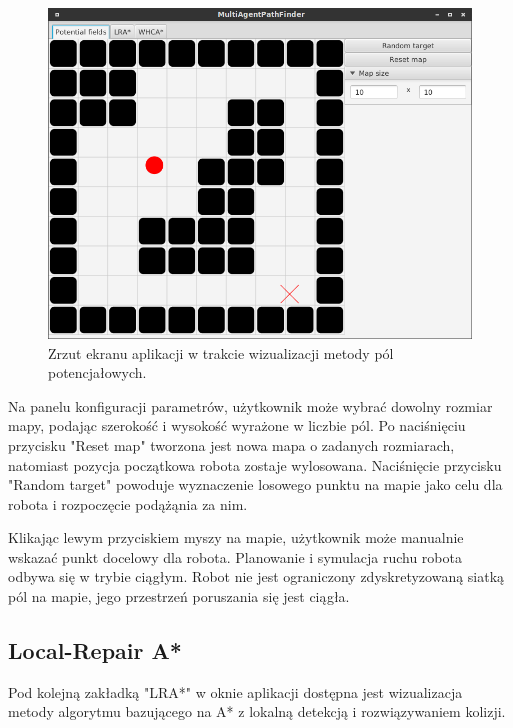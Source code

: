 \begin{figure}
	\centering
	\includegraphics[width=0.8\columnwidth]{img/robopath/ui-fields}
	\caption{Zrzut ekranu aplikacji w trakcie wizualizacji metody pól potencjałowych.}
	\label{fig:robopath-ui-fields}
\end{figure}

Na panelu konfiguracji parametrów, użytkownik może wybrać dowolny rozmiar mapy, podając szerokość i wysokość wyrażone w liczbie pól.
Po naciśnięciu przycisku "Reset map" tworzona jest nowa mapa o zadanych rozmiarach, natomiast pozycja początkowa robota zostaje wylosowana.
Naciśnięcie przycisku "Random target" powoduje wyznaczenie losowego punktu na mapie jako celu dla robota i rozpoczęcie podążąnia za nim.

Klikając lewym przyciskiem myszy na mapie, użytkownik może manualnie wskazać punkt docelowy dla robota.
Planowanie i symulacja ruchu robota odbywa się w trybie ciągłym. Robot nie jest ograniczony zdyskretyzowaną siatką pól na mapie, jego przestrzeń poruszania się jest ciągła.

\subsection{Local-Repair A*}
\label{ch:app-lra}
Pod kolejną zakładką "LRA*" w oknie aplikacji dostępna jest wizualizacja metody algorytmu bazującego na A* z lokalną detekcją i rozwiązywaniem kolizji.

